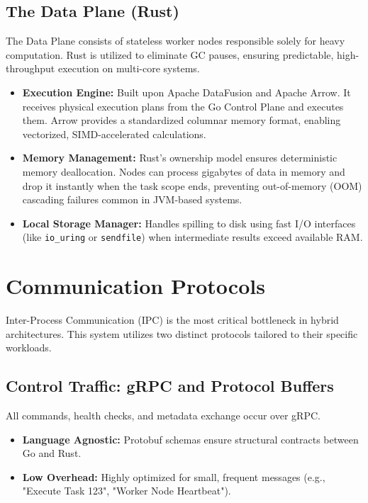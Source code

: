 \documentclass[11pt, a4paper]{article}
\begin{document}
\subsection{The Data Plane (Rust)}
The Data Plane consists of stateless worker nodes responsible solely for heavy computation. Rust is utilized to eliminate GC pauses, ensuring predictable, high-throughput execution on multi-core systems.

\begin{itemize}
    \item \textbf{Execution Engine:} Built upon Apache DataFusion and Apache Arrow. It receives physical execution plans from the Go Control Plane and executes them. Arrow provides a standardized columnar memory format, enabling vectorized, SIMD-accelerated calculations.
    \item \textbf{Memory Management:} Rust's ownership model ensures deterministic memory deallocation. Nodes can process gigabytes of data in memory and drop it instantly when the task scope ends, preventing out-of-memory (OOM) cascading failures common in JVM-based systems.
    \item \textbf{Local Storage Manager:} Handles spilling to disk using fast I/O interfaces (like \texttt{io\_uring} or \texttt{sendfile}) when intermediate results exceed available RAM.
\end{itemize}

\section{Communication Protocols}

Inter-Process Communication (IPC) is the most critical bottleneck in hybrid architectures. This system utilizes two distinct protocols tailored to their specific workloads.

\subsection{Control Traffic: gRPC and Protocol Buffers}
All commands, health checks, and metadata exchange occur over gRPC.
\begin{itemize}
    \item \textbf{Language Agnostic:} Protobuf schemas ensure structural contracts between Go and Rust.
    \item \textbf{Low Overhead:} Highly optimized for small, frequent messages (e.g., "Execute Task 123", "Worker Node Heartbeat").
\end{itemize}
\end{document}
